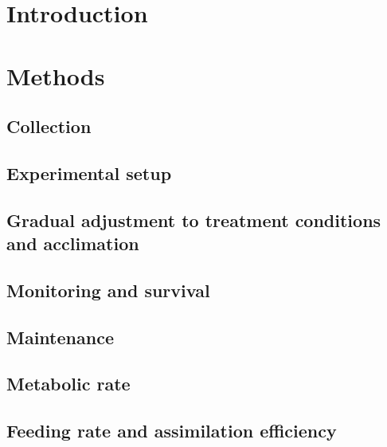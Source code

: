 \documentclass[
  oneside, 11pt, a4paper]{memoir}
\begin{document}
\hypertarget{introduction-1}{%
\section{Introduction}\label{introduction-1}}

\hypertarget{methods}{%
\section{Methods}\label{methods}}

\hypertarget{collection-1}{%
\subsection{Collection}\label{collection-1}}

\hypertarget{experimental-setup}{%
\subsection{Experimental setup}\label{experimental-setup}}

\hypertarget{gradual-adjustment-to-treatment-conditions-and-acclimation}{%
\subsection{Gradual adjustment to treatment conditions and acclimation}\label{gradual-adjustment-to-treatment-conditions-and-acclimation}}

\hypertarget{monitoring-and-survival}{%
\subsection{Monitoring and survival}\label{monitoring-and-survival}}

\hypertarget{maintenance}{%
\subsection{Maintenance}\label{maintenance}}

\hypertarget{metabolic-rate-2}{%
\subsection{Metabolic rate}\label{metabolic-rate-2}}

\hypertarget{feeding-rate-and-assimilation-efficiency}{%
\subsection{Feeding rate and assimilation efficiency}\label{feeding-rate-and-assimilation-efficiency}}
\end{document}
